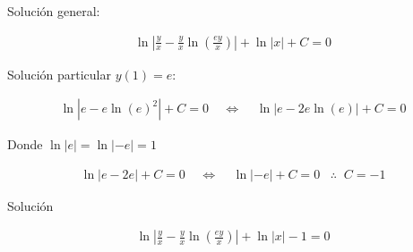 Solución general:

\begin{equation*}
    \begin{gathered}
        \ln\left|\frac{y}{x}-\frac{y}{x}\ln\left(\frac{ey}{x}\right)\right|+\ln|x|+C=0
    \end{gathered}
\end{equation*}

Solución particular \(\displaystyle y(1)=e\):

\begin{equation*}
    \begin{gathered}
        \ln\left|e-e\ln(e)^{2}\right|+C=0\;\;\;\;\Leftrightarrow\;\;\;\;\ln\left|e-2e\ln(e)\right|+C=0
    \end{gathered}
\end{equation*}

Donde \(\displaystyle \ln\left|e\right|=\ln\left|-e\right|=1\)

\begin{equation*}
    \begin{gathered}
        \ln|e-2e|+C=0\;\;\;\;\Leftrightarrow\;\;\;\;\ln|-e|+C=0\;\;\;\therefore\;\;C=-1
    \end{gathered}
\end{equation*}

Solución

\begin{equation*}
    \begin{gathered}
        \ln\left|\frac{y}{x}-\frac{y}{x}\ln\left(\frac{ey}{x}\right)\right|+\ln|x|-1=0
    \end{gathered}
\end{equation*}
\clearpage
